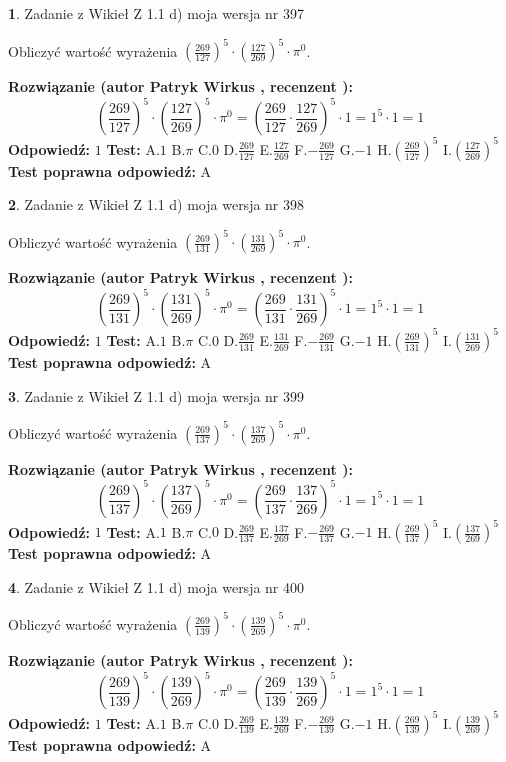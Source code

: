 \documentclass[12pt, a4paper]{article}
\theoremstyle{definition} %
\newtheorem{zad}{}
\newcommand{\zadStart}[1]{\begin{zad}#1\newline}
\newcommand{\zadStop}{\end{zad}}
\newcommand{\rozwStart}[2]{\noindent \textbf{Rozwiązanie (autor #1 , recenzent #2): }\newline}
\newcommand{\rozwStop}{\newline}
\newcommand{\odpStart}{\noindent \textbf{Odpowiedź:}\newline}
\newcommand{\odpStop}{\newline}
\newcommand{\testStart}{\noindent \textbf{Test:}\newline}
\newcommand{\testStop}{\newline}
\newcommand{\kluczStart}{\noindent \textbf{Test poprawna odpowiedź:}\newline}
\newcommand{\kluczStop}{\newline}
\begin{document}
\zadStart{Zadanie z Wikieł Z 1.1 d) moja wersja nr 397}

Obliczyć wartość wyrażenia $(\frac{269}{127})^{5} \cdot (\frac{127}{269})^{5} \cdot \pi^{0}$.
\zadStop
\rozwStart{Patryk Wirkus}{}
$$(\frac{269}{127})^{5} \cdot (\frac{127}{269})^{5} \cdot \pi^{0} = (\frac{269}{127} \cdot \frac{127}{269})^{5} \cdot 1 = 1^{5} \cdot 1 = 1$$
\rozwStop
\odpStart
$1$
\odpStop
\testStart
A.$1$ B.$\pi$ C.$0$ D.$\frac{269}{127}$ E.$\frac{127}{269}$
F.$-\frac{269}{127}$ G.$-1$
H.$(\frac{269}{127})^{5}$
I.$(\frac{127}{269})^{5}$
\testStop
\kluczStart
A
\kluczStop



\zadStart{Zadanie z Wikieł Z 1.1 d) moja wersja nr 398}

Obliczyć wartość wyrażenia $(\frac{269}{131})^{5} \cdot (\frac{131}{269})^{5} \cdot \pi^{0}$.
\zadStop
\rozwStart{Patryk Wirkus}{}
$$(\frac{269}{131})^{5} \cdot (\frac{131}{269})^{5} \cdot \pi^{0} = (\frac{269}{131} \cdot \frac{131}{269})^{5} \cdot 1 = 1^{5} \cdot 1 = 1$$
\rozwStop
\odpStart
$1$
\odpStop
\testStart
A.$1$ B.$\pi$ C.$0$ D.$\frac{269}{131}$ E.$\frac{131}{269}$
F.$-\frac{269}{131}$ G.$-1$
H.$(\frac{269}{131})^{5}$
I.$(\frac{131}{269})^{5}$
\testStop
\kluczStart
A
\kluczStop



\zadStart{Zadanie z Wikieł Z 1.1 d) moja wersja nr 399}

Obliczyć wartość wyrażenia $(\frac{269}{137})^{5} \cdot (\frac{137}{269})^{5} \cdot \pi^{0}$.
\zadStop
\rozwStart{Patryk Wirkus}{}
$$(\frac{269}{137})^{5} \cdot (\frac{137}{269})^{5} \cdot \pi^{0} = (\frac{269}{137} \cdot \frac{137}{269})^{5} \cdot 1 = 1^{5} \cdot 1 = 1$$
\rozwStop
\odpStart
$1$
\odpStop
\testStart
A.$1$ B.$\pi$ C.$0$ D.$\frac{269}{137}$ E.$\frac{137}{269}$
F.$-\frac{269}{137}$ G.$-1$
H.$(\frac{269}{137})^{5}$
I.$(\frac{137}{269})^{5}$
\testStop
\kluczStart
A
\kluczStop



\zadStart{Zadanie z Wikieł Z 1.1 d) moja wersja nr 400}

Obliczyć wartość wyrażenia $(\frac{269}{139})^{5} \cdot (\frac{139}{269})^{5} \cdot \pi^{0}$.
\zadStop
\rozwStart{Patryk Wirkus}{}
$$(\frac{269}{139})^{5} \cdot (\frac{139}{269})^{5} \cdot \pi^{0} = (\frac{269}{139} \cdot \frac{139}{269})^{5} \cdot 1 = 1^{5} \cdot 1 = 1$$
\rozwStop
\odpStart
$1$
\odpStop
\testStart
A.$1$ B.$\pi$ C.$0$ D.$\frac{269}{139}$ E.$\frac{139}{269}$
F.$-\frac{269}{139}$ G.$-1$
H.$(\frac{269}{139})^{5}$
I.$(\frac{139}{269})^{5}$
\testStop
\kluczStart
A
\kluczStop
\end{document}

